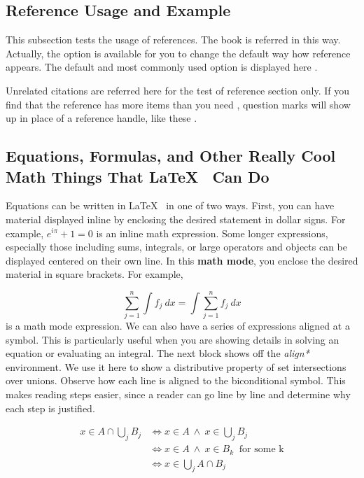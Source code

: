 \subsection{Reference Usage and Example}

This subsection tests the usage of references. The book\cite{REALCAR} 
is referred in this way. Actually, the option is available for you to change the default way how reference appears. The default and most commonly used option \cite{einstein} is displayed here \cite{Barn-JORVQ}.

Unrelated citations are referred here for the test of reference section only\cite{TAMU}. If you
find that the reference \cite{GIGEM} has more items than you need \cite{WAGFJ}, question marks will show up in place of a reference handle, like these \cite{Over9000}.

\subsection{Equations, Formulas, and Other Really Cool Math Things That \LaTeX ~ Can Do}

Equations can be written in \LaTeX ~ in one of two ways. First, you can have material displayed inline by enclosing the desired statement in dollar signs. For example, $e^{i\pi}+1=0$ is an inline math expression. Some longer expressions, especially those including sums, integrals, or large operators and objects can be displayed centered on their own line. In this \textbf{math mode}, you enclose the desired material in square brackets. For example,

\[ \sum_{j = 1} ^n \int f_j \ dx = \int \sum_{j = 1} ^n f_j \ dx \]
is a math mode expression. We can also have a series of expressions aligned at a symbol. This is particularly useful when you are showing details in solving an equation or evaluating an integral. The next block shows off the \textit{align*} environment. We use it here to show a distributive property of set intersections over unions. Observe how each line is aligned to the biconditional symbol. This makes reading steps easier, since a reader can go line by line and determine why each step is justified.

\begin{align*}
x \in A \cap \bigcup_{j} B_j &\iff x \in A \ \wedge \ x \in \bigcup_{j} B_j \\
&\iff x \in A \ \wedge \ x \in B_k \ \text{ for some k} \\
&\iff x \in \bigcup_{j} A \cap B_j
\end{align*}

